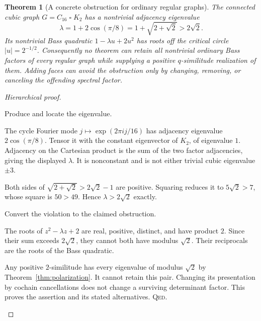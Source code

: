\documentclass[11pt,a4paper]{article}
\newtheorem{theorem}[definition]{Theorem}
\theoremstyle{remark}\newtheorem{remark}[definition]{Remark}
\newcommand{\QED}{\textsc{Qed}}
\begin{document}
\begin{theorem}[A concrete obstruction for ordinary regular graphs]\label{thm:prism}
The connected cubic graph $G=C_{16}\mathbin\square K_2$ has a nontrivial adjacency eigenvalue
\[
\lambda=1+2\cos(\pi/8)=1+\sqrt{2+\sqrt2}>2\sqrt2.
\]
Its nontrivial Bass quadratic $1-\lambda u+2u^2$ has roots off the critical circle $|u|=2^{-1/2}$. Consequently no theorem can retain all nontrivial ordinary Bass factors of every regular graph while supplying a positive $q$-similitude realization of them. Adding faces can avoid the obstruction only by changing, removing, or canceling the offending spectral factor.
\end{theorem}
\begin{proof}[Hierarchical proof]
\begin{steps}
\item Produce and locate the eigenvalue.
\begin{steps}
\item The cycle Fourier mode $j\mapsto\exp(2\pi i j/16)$ has adjacency eigenvalue $2\cos(\pi/8)$. Tensor it with the constant eigenvector of $K_2$, of eigenvalue $1$. Adjacency on the Cartesian product is the sum of the two factor adjacencies, giving the displayed $\lambda$. It is nonconstant and is not either trivial cubic eigenvalue $\pm3$.
\item Both sides of $\sqrt{2+\sqrt2}>2\sqrt2-1$ are positive. Squaring reduces it to $5\sqrt2>7$, whose square is $50>49$. Hence $\lambda>2\sqrt2$ exactly.
\end{steps}
\item Convert the violation to the claimed obstruction.
\begin{steps}
\item The roots of $z^2-\lambda z+2$ are real, positive, distinct, and have product $2$. Since their sum exceeds $2\sqrt2$, they cannot both have modulus $\sqrt2$. Their reciprocals are the roots of the Bass quadratic.
\item Any positive $2$-similitude has every eigenvalue of modulus $\sqrt2$ by Theorem~\ref{thm:polarization}. It cannot retain this pair. Changing its presentation by cochain cancellations does not change a surviving determinant factor. This proves the assertion and its stated alternatives. \QED.
\end{steps}
\end{steps}
\end{proof}
\end{document}
